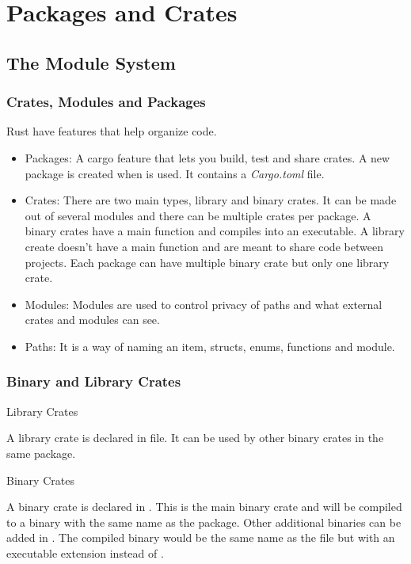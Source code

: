 \documentclass{beamer}
\begin{document}
\section{Packages and Crates}
\subsection{The Module System}
\begin{frame} \frametitle{Crates, Modules and Packages} Rust have features that help organize code.

  \begin{itemize}
    \item{Packages: A cargo feature that lets you build, test and share crates. A new package is created when  is used. It contains a \emph{Cargo.toml} file.}
    \item{Crates: There are two main types, library and binary crates. It can be made out of several modules and there can be multiple crates per package. A binary crates have a main function and compiles into an executable. A library create doesn't have a main function and are meant to share code between projects. Each package can have multiple binary crate but only one library crate.}
    \item{Modules: Modules are used to control privacy of paths and what external crates and modules can see.}
    \item{Paths: It is a way of naming an item, structs, enums, functions and module.}
  \end{itemize}
\end{frame}

\begin{frame}
  \frametitle{Binary and Library Crates}
  {\fontsize{15pt}{18pt}\selectfont Library Crates}

  A library crate is declared in  file. It can be used by other binary crates in the same package.

  {\fontsize{15pt}{18pt}\selectfont Binary Crates}

  A binary crate is declared in . This is the main binary crate and will be compiled to a binary with the same name as the package. Other additional binaries can be added in . The compiled binary would be the same name as the file but with an executable extension instead of .
\end{frame}
\end{document}
